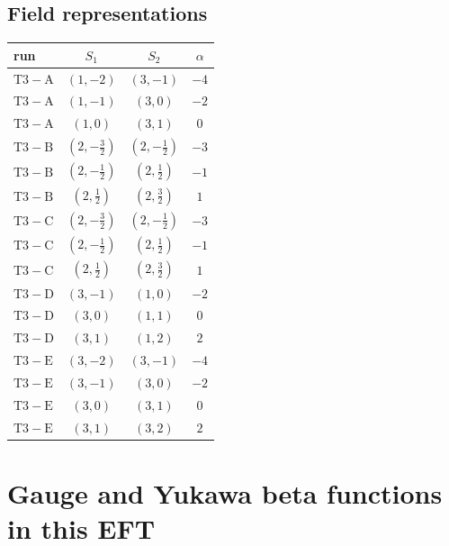 \documentclass[9pt]{article}
\begin{document}
\subsection*{Field representations}
\begin{longtable}{@{}lccc@{}}
\toprule
run & $S_1$ & $S_2$ & $\alpha$ \\
\midrule
$\mathrm{T3-A}$ & $(1,-2)$ & $(3,-1)$ & $-4$ \\
$\mathrm{T3-A}$ & $(1,-1)$ & $(3,0)$ & $-2$ \\
$\mathrm{T3-A}$ & $(1,0)$ & $(3,1)$ & $0$ \\
$\mathrm{T3-B}$ & $(2,- \frac{3}{2})$ & $(2,- \frac{1}{2})$ & $-3$ \\
$\mathrm{T3-B}$ & $(2,- \frac{1}{2})$ & $(2,\frac{1}{2})$ & $-1$ \\
$\mathrm{T3-B}$ & $(2,\frac{1}{2})$ & $(2,\frac{3}{2})$ & $1$ \\
$\mathrm{T3-C}$ & $(2,- \frac{3}{2})$ & $(2,- \frac{1}{2})$ & $-3$ \\
$\mathrm{T3-C}$ & $(2,- \frac{1}{2})$ & $(2,\frac{1}{2})$ & $-1$ \\
$\mathrm{T3-C}$ & $(2,\frac{1}{2})$ & $(2,\frac{3}{2})$ & $1$ \\
$\mathrm{T3-D}$ & $(3,-1)$ & $(1,0)$ & $-2$ \\
$\mathrm{T3-D}$ & $(3,0)$ & $(1,1)$ & $0$ \\
$\mathrm{T3-D}$ & $(3,1)$ & $(1,2)$ & $2$ \\
$\mathrm{T3-E}$ & $(3,-2)$ & $(3,-1)$ & $-4$ \\
$\mathrm{T3-E}$ & $(3,-1)$ & $(3,0)$ & $-2$ \\
$\mathrm{T3-E}$ & $(3,0)$ & $(3,1)$ & $0$ \\
$\mathrm{T3-E}$ & $(3,1)$ & $(3,2)$ & $2$ \\
\bottomrule
\end{longtable}
\section*{Gauge and Yukawa beta functions in this EFT}
\end{document}
